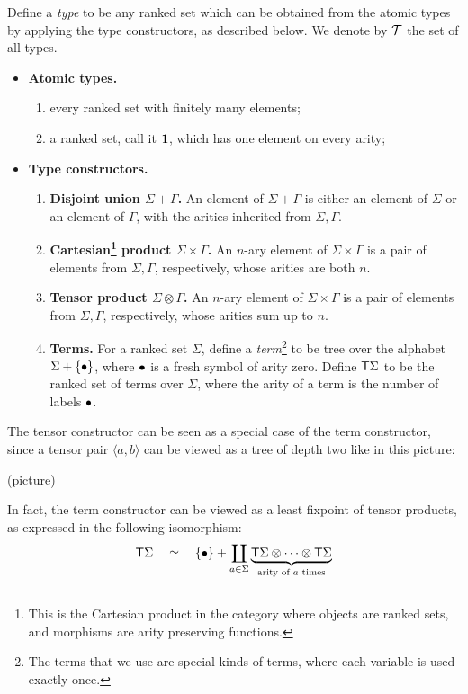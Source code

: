 \begin{definition}[Types]\label{def:types}
    Define a \emph{type} to be any ranked set which can be obtained from the atomic types by applying the type constructors, as described below. We denote by ${\mathcal T}$ the set of all types. 
    \begin{itemize}
        \item {\bf Atomic types.} 
           \begin{enumerate}
            \item every ranked set with finitely many elements;
            \item a ranked set, call it  $\mathbf{1}$, which has one element on every arity;
        \end{enumerate}
    \item {\bf Type constructors.} 
     \begin{enumerate}
        \item {\bf Disjoint union $\Sigma+\Gamma$.} An element of $\Sigma+\Gamma$ is either an element of $\Sigma$ or an element of $\Gamma$, with the arities inherited from $\Sigma,\Gamma$. 
        \item {\bf Cartesian\footnote{This is the Cartesian product in the category where objects are ranked sets, and morphisms are arity preserving functions.}  product $\Sigma \times \Gamma$.} An  $n$-ary element of $\Sigma \times \Gamma$ is a pair of elements from $\Sigma, \Gamma$, respectively, whose arities are both $n$.
        \item {\bf Tensor product $\Sigma \otimes \Gamma$.} An  $n$-ary element of $\Sigma \times \Gamma$ is a pair of elements from $\Sigma, \Gamma$, respectively, whose arities  sum up to $n$.
        \item {\bf Terms.} For a ranked set  $\Sigma$, define a \emph{term}\footnote{The terms that we use are special kinds of terms, where each variable is used exactly once.} to be tree over the alphabet $\Sigma + \{\bullet\}$, where $\bullet$ is a fresh symbol of arity zero. Define $\mathsf T \Sigma$ to be the ranked set of terms over $\Sigma$, where the arity of a term is the number of labels $\bullet$.
    \end{enumerate}  
    \end{itemize}  
\end{definition}

\newcommand{\tensorpair}[2]{\langle #1, #2 \rangle}

The tensor constructor can be seen as a special case of the term constructor, since a tensor pair $\tensorpair a b$  can be viewed as a tree of depth two like in this picture:
\begin{center}
    (picture)
\end{center}
In fact, the term constructor can be viewed as a least fixpoint of tensor products, as expressed in the following isomorphism:
\begin{align*}
    \mathsf T \Sigma \quad \simeq \quad  \{\bullet\} + \coprod_{a \in \Sigma} \underbrace{\mathsf T \Sigma \otimes \cdots \otimes \mathsf T \Sigma}_{\text{arity of $a$ times}}
\end{align*}

